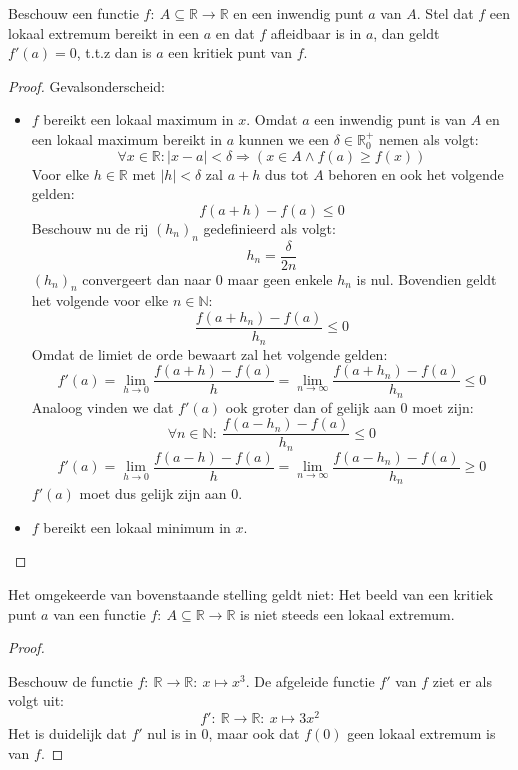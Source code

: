 \documentclass[main.tex]{subfiles}
\begin{document}
\begin{bpr}
  Beschouw een functie $f:\ A \subseteq \mathbb{R} \rightarrow \mathbb{R}$ en een inwendig punt $a$ van $A$.
  Stel dat $f$ een lokaal extremum bereikt in een $a$ en dat $f$ afleidbaar is in $a$, dan geldt $f'(a) = 0$, t.t.z dan is $a$ een kritiek punt van $f$.

  \begin{proof}
    Gevalsonderscheid:
    \begin{itemize}
    \item $f$ bereikt een lokaal maximum in $x$.
      Omdat $a$ een inwendig punt is van $A$ en een lokaal maximum bereikt in $a$ kunnen we een $\delta \in \mathbb{R}_{0}^{+}$ nemen als volgt:
      \[ \forall x\in \mathbb{R}: |x-a| < \delta \Rightarrow (x\in A \wedge f(a) \ge f(x)) \]
      Voor elke $h\in \mathbb{R}$ met $|h| < \delta$ zal $a+h$ dus tot $A$ behoren en ook het volgende gelden:
      \[ f(a+h) -f(a) \le 0 \]
      Beschouw nu de rij $(h_{n})_{n}$ gedefinieerd als volgt:
      \[ h_{n} = \frac{\delta}{2n} \]
      $(h_{n})_{n}$ convergeert dan naar $0$ maar geen enkele $h_{n}$ is nul.
      Bovendien geldt het volgende voor elke $n\in \mathbb{N}$:
      \[ \frac{f(a+h_{n}) -f(a)}{h_{n}} \le 0 \]
      Omdat de limiet de orde bewaart zal het volgende gelden:
      \[ f'(a) = \lim_{h\rightarrow 0}\frac{f(a+h)-f(a)}{h} = \lim_{n \rightarrow \infty}\frac{f(a+h_{n})-f(a)}{h_{n}} \le 0 \]
      Analoog vinden we dat $f'(a)$ ook groter dan of gelijk aan $0$ moet zijn:
      \[ \forall n\in \mathbb{N}:\ \frac{f(a-h_{n}) -f(a)}{h_{n}} \le 0 \]
      \[ f'(a) = \lim_{h\rightarrow 0}\frac{f(a-h)-f(a)}{h} = \lim_{n \rightarrow \infty}\frac{f(a-h_{n})-f(a)}{h_{n}} \ge 0 \]
      $f'(a)$ moet dus gelijk zijn aan $0$.
    \item $f$ bereikt een lokaal minimum in $x$.
    \end{itemize}
  \end{proof}
\end{bpr}

\begin{tvb}
  Het omgekeerde van bovenstaande stelling geldt niet:
  Het beeld van een kritiek punt $a$ van een functie $f:\ A \subseteq \mathbb{R} \rightarrow \mathbb{R}$ is niet steeds een lokaal extremum.

  \begin{proof}
    \begin{figure}[H]
      \centering
    \end{figure}
    Beschouw de functie $f:\ \mathbb{R} \rightarrow \mathbb{R}:\ x \mapsto x^{3}$.
    De afgeleide functie $f'$ van $f$ ziet er als volgt uit:
    \[ f':\ \mathbb{R} \rightarrow \mathbb{R}:\ x \mapsto 3x^{2} \]
    Het is duidelijk dat $f'$ nul is in $0$, maar ook dat $f(0)$ geen lokaal extremum is van $f$.
  \end{proof}
\end{tvb}
\end{document}
